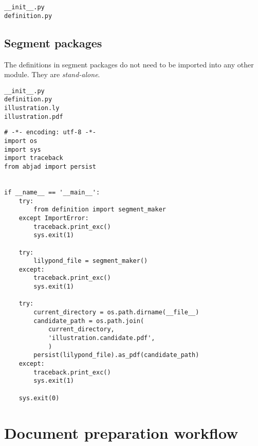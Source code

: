 \begin{singlespacing}
\vspace{-0.5\baselineskip}
\begin{lstlisting}
__init__.py
definition.py
\end{lstlisting}
\end{singlespacing}

\subsection{Segment packages}

The definitions in segment packages do not need to be imported into any other
module. They are \emph{stand-alone}.

\begin{singlespacing}
\vspace{-0.5\baselineskip}
\begin{lstlisting}
__init__.py
definition.py
illustration.ly
illustration.pdf
\end{lstlisting}
\end{singlespacing}

\begin{singlespacing}
\vspace{-0.5\baselineskip}
\begin{lstlisting}
# -*- encoding: utf-8 -*-
import os
import sys
import traceback
from abjad import persist


if __name__ == '__main__':
    try:
        from definition import segment_maker
    except ImportError:
        traceback.print_exc()
        sys.exit(1)

    try:
        lilypond_file = segment_maker()
    except:
        traceback.print_exc()
        sys.exit(1)

    try:
        current_directory = os.path.dirname(__file__)
        candidate_path = os.path.join(
            current_directory,
            'illustration.candidate.pdf',
            )
        persist(lilypond_file).as_pdf(candidate_path)
    except:
        traceback.print_exc()
        sys.exit(1)

    sys.exit(0)
\end{lstlisting}
\end{singlespacing}

\section{Document preparation workflow}

